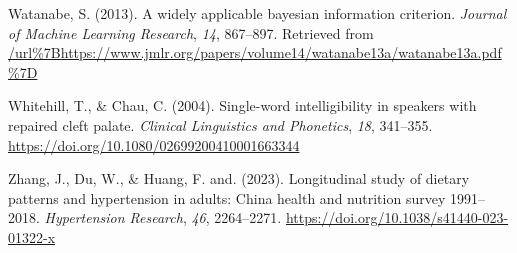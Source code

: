 \documentclass[
]{agujournal2019}
\newlength{\cslhangindent}
\newenvironment{CSLReferences}[2] %
 {\begin{list}{}{%
  \setlength{\itemindent}{0pt}
  \setlength{\leftmargin}{0pt}
  \setlength{\parsep}{0pt}
  \ifodd #1
   \setlength{\leftmargin}{\cslhangindent}
   \setlength{\itemindent}{-1\cslhangindent}
  \fi
  \setlength{\itemsep}{#2\baselineskip}}}
 {\end{list}}
\begin{document}
\begin{CSLReferences}{1}{0}
Watanabe, S. (2013). A widely applicable bayesian information criterion.
\emph{Journal of Machine Learning Research}, \emph{14}, 867--897.
Retrieved from
\url{/url\%7Bhttps://www.jmlr.org/papers/volume14/watanabe13a/watanabe13a.pdf\%7D}

Whitehill, T., \& Chau, C. (2004). Single-word intelligibility in
speakers with repaired cleft palate. \emph{Clinical Linguistics and
Phonetics}, \emph{18}, 341--355.
\url{https://doi.org/10.1080/02699200410001663344}

Zhang, J., Du, W., \& Huang, F. and. (2023). Longitudinal study of
dietary patterns and hypertension in adults: China health and nutrition
survey 1991--2018. \emph{Hypertension Research}, \emph{46}, 2264--2271.
\url{https://doi.org/10.1038/s41440-023-01322-x}

\end{CSLReferences}
\end{document}
